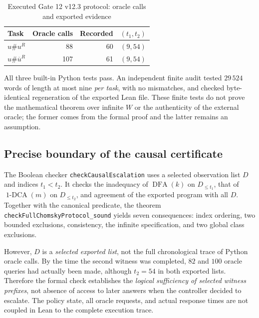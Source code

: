 \documentclass[11pt,a4paper]{article}
\newcommand{\DFA}{\operatorname{DFA}}
\newcommand{\oneDCA}{\operatorname{1\text{-}DCA}}
\begin{document}
\begin{table}[htbp]
\centering\small
\caption{Executed Gate 12 v12.3 protocol: oracle calls and exported evidence}\label{tab:gate12}
\renewcommand{\arraystretch}{1.15}
\begin{tabularx}{\linewidth}{@{}>{\raggedright\arraybackslash}Xrrr@{}}
\toprule
\textbf{Task} & \textbf{Oracle calls} & \textbf{Recorded} & \textbf{$(t_1,t_2)$}\\
\midrule
$u\#u^R$ & 88 & 60 & $(9,54)$\\
$u\#\overline{u}^R$ & 107 & 61 & $(9,54)$\\
\bottomrule
\end{tabularx}
\end{table}

All three built-in Python tests pass. An independent finite audit tested $29\,524$ words of length at most nine \emph{per task}, with no mismatches, and checked byte-identical regeneration of the exported Lean file. These finite tests do not prove the mathematical theorem over infinite $W$ or the authenticity of the external oracle; the former comes from the formal proof and the latter remains an assumption.

\subsection{Precise boundary of the causal certificate}

The Boolean checker \texttt{checkCausalEscalation} uses a selected observation list $D$ and indices $t_1<t_2$. It checks the inadequacy of $\DFA(k)$ on $D_{\le t_1}$, that of $\oneDCA(m)$ on $D_{\le t_2}$, and agreement of the exported program with all $D$. Together with the canonical predicate, the theorem \texttt{checkFullChomskyProtocol\_sound} yields seven consequences: index ordering, two bounded exclusions, consistency, the infinite specification, and two global class exclusions.

However, $D$ is a \emph{selected exported list}, not the full chronological trace of Python oracle calls. By the time the second witness was completed, $82$ and $100$ oracle queries had actually been made, although $t_2=54$ in both exported lists. Therefore the formal check establishes the \emph{logical sufficiency of selected witness prefixes}, not absence of access to later answers when the controller decided to escalate. The policy state, all oracle requests, and actual response times are not coupled in Lean to the complete execution trace.
\end{document}
